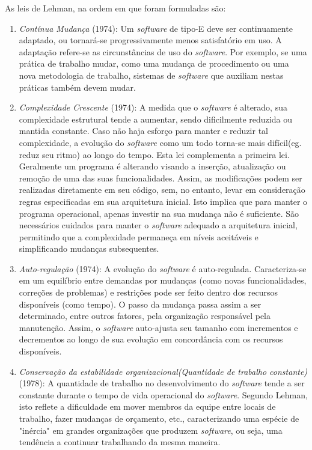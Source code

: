 As leis de Lehman, na ordem em que foram formuladas são:
\begin{enumerate}
	\item \textit{Contínua Mudança }(1974): Um \textit{software} de tipo-E deve ser continuamente adaptado, ou tornará-se progressivamente menos satisfatório em uso. A adaptação refere-se as circunstâncias de uso do \textit{software}. Por exemplo, se uma prática de trabalho mudar, como uma mudança de procedimento ou uma nova metodologia de trabalho, sistemas de \textit{software} que auxiliam nestas práticas também devem mudar.
	\item \textit{Complexidade Crescente }(1974): A medida que o \textit{software} é alterado, sua complexidade estrutural tende a aumentar, sendo dificilmente reduzida ou mantida constante. Caso não haja esforço para manter e reduzir tal complexidade, a evolução do \textit{software} como um todo torna-se mais difícil(eg. reduz seu ritmo) ao longo do tempo. Esta lei complementa a primeira lei. Geralmente um programa é alterando visando a inserção, atualização ou remoção de uma das suas funcionalidades. Assim, as modificações podem ser realizadas diretamente em seu código, sem, no entanto, levar em consideração regras especificadas em sua arquitetura inicial. Isto implica que para manter o programa operacional, apenas investir na sua mudança não é suficiente. São necessários cuidados para manter o \textit{software} adequado a arquitetura inicial, permitindo que a complexidade permaneça em níveis aceitáveis e simplificando mudanças subsequentes.
	\item \textit{Auto-regulação }(1974): A evolução do \textit{software} é auto-regulada. Caracteriza-se em um equilíbrio entre demandas por mudanças (como novas funcionalidades, correções de problemas) e restrições pode ser feito dentro dos recursos disponíveis (como tempo). O passo da mudança passa assim a ser determinado, entre outros fatores, pela organização responsável pela manutenção. Assim, o \textit{software} auto-ajusta seu tamanho com incrementos e decrementos ao longo de sua evolução em concordância com os recursos disponíveis.
	\item \textit{Conservação da estabilidade organizacional(Quantidade de trabalho constante) }(1978): A quantidade de trabalho no desenvolvimento do \textit{software} tende a ser constante durante o tempo de vida operacional do \textit{software}. Segundo Lehman, isto reflete a dificuldade em mover membros da equipe entre locais de trabalho, fazer mudanças de orçamento, etc., caracterizando uma espécie de "inércia" em grandes organizações que produzem \textit{software}, ou seja, uma tendência a continuar trabalhando da mesma maneira. 

\end{enumerate}
